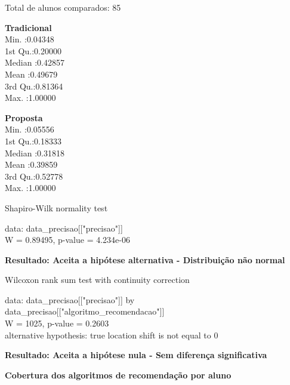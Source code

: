 Total de alunos comparados: 85

\begin{multicols}{2}

\noindent\textbf{Tradicional}\\
Min.   :0.04348\\
1st Qu.:0.20000\\
Median :0.42857\\
Mean   :0.49679\\
3rd Qu.:0.81364\\
Max.   :1.00000\\

\columnbreak

\noindent\textbf{Proposta}\\
Min.   :0.05556\\
1st Qu.:0.18333\\
Median :0.31818\\
Mean   :0.39859\\
3rd Qu.:0.52778\\
Max.   :1.00000
\end{multicols}

  Shapiro-Wilk normality test

\noindent
data:  data\_precisao[["precisao"]]\\
W = 0.89495, p-value = 4.234e-06

\textbf{Resultado: Aceita a hipótese alternativa - Distribuição não normal}

Wilcoxon rank sum test with continuity correction

\noindent
data:  data\_precisao[["precisao"]] by \\
data\_precisao[["algoritmo\_recomendacao"]]\\
W = 1025, p-value = 0.2603\\
alternative hypothesis: true location shift is not equal to 0

\textbf{Resultado: Aceita a hipótese nula - Sem diferença significativa}

\textbf{Cobertura dos algoritmos de recomendação por aluno}

